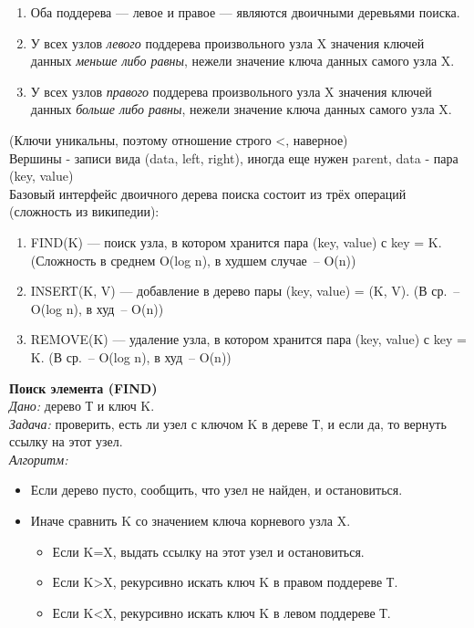 \begin{enumerate}
\item Оба поддерева — левое и правое — являются двоичными деревьями поиска.
\item У всех узлов \textit{левого} поддерева произвольного узла X значения ключей данных \textit{меньше либо равны}, нежели значение ключа данных самого узла X.
\item У всех узлов \textit{правого} поддерева произвольного узла X значения ключей данных \textit{больше либо равны}, нежели значение ключа данных самого узла X.
\end{enumerate}
(Ключи уникальны, поэтому отношение строго <, наверное)\\
Вершины - записи вида (data, left, right), иногда еще нужен parent, data - пара (key, value)\\
Базовый интерфейс двоичного дерева поиска состоит из трёх операций (сложность из википедии):
\begin{enumerate}
\item FIND(K) — поиск узла, в котором хранится пара (key, value) с key = K. (Сложность в среднем  O(log n), в худшем случае~-- O(n))
\item INSERT(K, V) — добавление в дерево пары (key, value) = (K, V). (В ср.~-- O(log n), в худ~-- O(n))
\item REMOVE(K) — удаление узла, в котором хранится пара (key, value) с key = K. (В ср.~-- O(log n), в худ~-- O(n))
\end{enumerate}
{\bf Поиск элемента (FIND)}\\
\textit{Дано:} дерево Т и ключ K.\\
\textit{Задача:} проверить, есть ли узел с ключом K в дереве Т, и если да, то вернуть ссылку на этот узел.\\
\textit{Алгоритм:}
\begin{itemize}
\item Если дерево пусто, сообщить, что узел не найден, и остановиться.
\item Иначе сравнить K со значением ключа корневого узла X.
\begin{itemize}
\item[\labelitemi] Если K=X, выдать ссылку на этот узел и остановиться.
\item[\labelitemi] Если K>X, рекурсивно искать ключ K в правом поддереве Т.
\item[\labelitemi] Если K<X, рекурсивно искать ключ K в левом поддереве Т.
\end{itemize}
\end{itemize}
